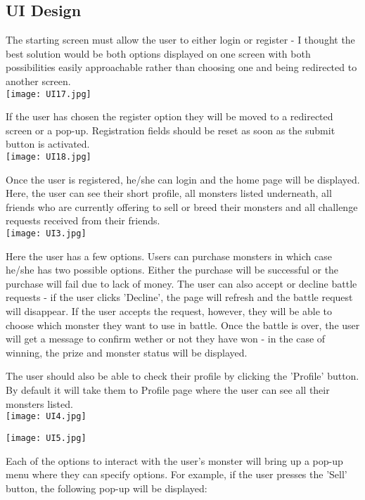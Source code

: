 \documentclass[a4paper]{article}
\begin{document}
\subsection{UI Design}

The starting screen must allow the user to either login or register - I thought the best solution would be both options displayed on one screen with both possibilities easily approachable rather than choosing one and being redirected to another screen.\\

\texttt{[image: UI17.jpg]}
\clearpage

If the user has chosen the register option they will be moved to a redirected screen or a pop-up. Registration fields should be reset as soon as the submit button is activated.\\
\texttt{[image: UI18.jpg]}
\clearpage

Once the user is registered, he/she can login and the home page will be displayed. Here, the user can see their short profile, all monsters listed underneath, all friends who are currently offering to sell or breed their monsters and all challenge requests received from their friends.\\

\texttt{[image: UI3.jpg]}

Here the user has a few options. Users can purchase monsters in which case he/she has two possible options. Either the purchase will be successful or the purchase will fail due to lack of money. The user can also accept or decline battle requests - if the user clicks 'Decline', the page will refresh and the battle request will disappear. If the user accepts the request, however, they will be able to choose which monster they want to use in battle. Once the battle is over, the user will get a message to confirm wether or not they have won - in the case of winning, the prize and monster status will be displayed.
\clearpage

The user should also be able to check their profile by clicking the 'Profile' button. By default it will take them to Profile page where the user can see all their monsters listed.\\

\texttt{[image: UI4.jpg]}

\texttt{[image: UI5.jpg]}

Each of the options to interact with the user's monster will bring up a pop-up menu where they can specify options. For example, if the user presses the 'Sell' button, the following pop-up will be displayed:
\end{document}
